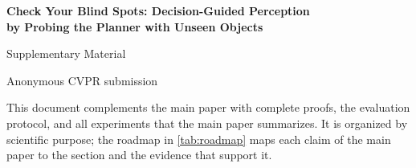 \documentclass[10pt,letterpaper]{article}
\theoremstyle{remark}
\theoremstyle{plain}
\theoremstyle{definition}
\begin{document}
\thispagestyle{plain}
\begin{center}
{\Large\bfseries Check Your Blind Spots: Decision-Guided Perception\\ by Probing the Planner with Unseen Objects\par}
\vspace{0.5em}
{\Large Supplementary Material\par}
\vspace{1.0em}
{\large Anonymous CVPR submission\par}
\end{center}
\vspace{6pt}

This document complements the main paper with complete proofs, the evaluation protocol, and all experiments that the main paper summarizes.
It is organized by scientific purpose; the roadmap in \cref{tab:roadmap} maps each claim of the main paper to the section and the evidence that support it.
\end{document}
